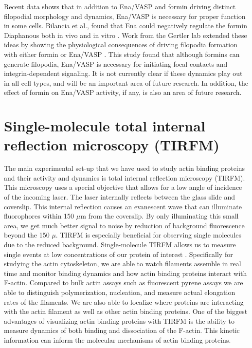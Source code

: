 Recent data shows that in addition to Ena/VASP and formin driving distinct filopodial morphology and dynamics, Ena/VASP is necessary for proper function in some cells. Bilancia et al., found that Ena could negatively regulate the formin Diaphanous both in vivo and in vitro \citep{bilancia_enabled_2014}. Work from the Gertler lab extended these ideas by showing the physiological consequences of driving filopodia formation with either formin or Ena/VASP \citep{barzik_ena/vasp_2005}. This study found that although formins can generate filopodia, Ena/VASP is necessary for initiating focal contacts and integrin-dependent signaling. It is not currently clear if these dynamics play out in all cell types, and will be an important area of future research. In addition, the effect of formin on Ena/VASP activity, if any, is also an area of future research.

\section{Single-molecule total internal reflection microscopy (TIRFM)}\label{tirfm}
The main experimental set-up that we have used to study actin binding proteins and their activity and dynamics is total internal reflection microscopy (TIRFM). This microscopy uses a special objective that allows for a low angle of incidence of the incoming laser. The laser internally reflects between the glass slide and coverslip. This internal reflection causes an evanescent wave that can illuminate fluorophores within 150 $\mu$m from the coverslip. By only illuminating this small area, we get much better signal to noise by reduction of background fluorescence beyond the 150 $\mu$. TIRFM is especially beneficial for observing single molecules due to the reduced background. Single-molecule TIRFM allows us to measure single events at low concentrations of our protein of interest \citep{zimmermann_vitro_2016,fish_total_2009}. Specifically for studying the actin cytoskeleton, we are able to watch filaments assemble in real time and monitor binding dynamics and how actin binding proteins interact with F-actin. Compared to bulk actin assays such as fluorescent pyrene assays we are able to distinguish polymerization, nucleation, and measure actual elongation rates of the filaments. We are also able to localize where proteins are interacting with the actin filament as well as other actin binding proteins. One of the biggest advantages of visualizing actin binding proteins with TIRFM is the ability to measure dynamics of both binding and dissociation of the F-actin. This kinetic information can inform the molecular mechanisms of actin binding proteins.

